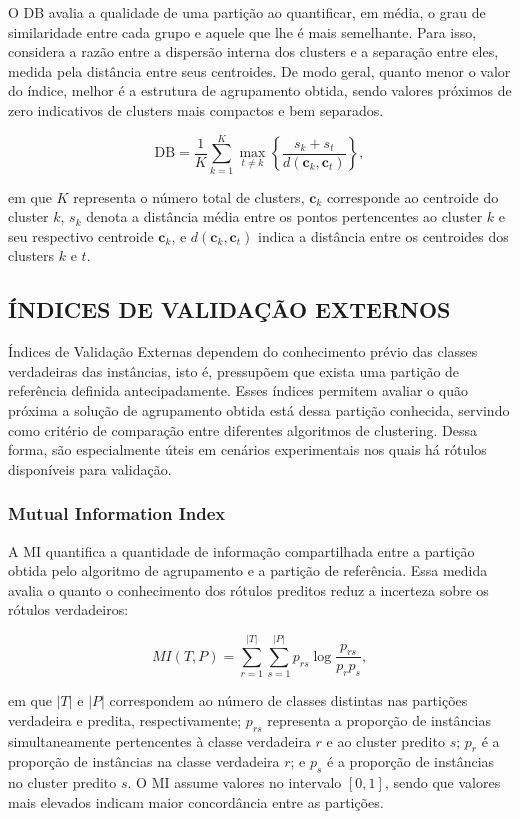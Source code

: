O \gls{DB} \cite{davies1979cluster} avalia a qualidade de uma partição ao quantificar, em média, o grau de similaridade entre cada grupo e aquele que lhe é mais semelhante. Para isso, considera a razão entre a dispersão interna dos clusters e a separação entre eles, medida pela distância entre seus centroides. De modo geral, quanto menor o valor do índice, melhor é a estrutura de agrupamento obtida, sendo valores próximos de zero indicativos de clusters mais compactos e bem separados.

\[
\text{DB} = \frac{1}{K} \sum_{k=1}^K \max_{t \neq k} \left\{\frac{s_k + s_t}{d(\mathbf{c}_k, \mathbf{c}_t)}\right\},
\]

em que $K$ representa o número total de clusters, $\mathbf{c}_k$ corresponde ao centroide do cluster $k$, $s_k$ denota a distância média entre os pontos pertencentes ao cluster $k$ e seu respectivo centroide $\mathbf{c}_k$, e $d(\mathbf{c}_k, \mathbf{c}_t)$ indica a distância entre os centroides dos clusters $k$ e $t$.

\subsection{ÍNDICES DE VALIDAÇÃO EXTERNOS}

Índices de Validação Externas dependem do conhecimento prévio das classes verdadeiras das instâncias, isto é, pressupõem que exista uma partição de referência definida antecipadamente. Esses índices permitem avaliar o quão próxima a solução de agrupamento obtida está dessa partição conhecida, servindo como critério de comparação entre diferentes algoritmos de clustering. Dessa forma, são especialmente úteis em cenários experimentais nos quais há rótulos disponíveis para validação.

\subsubsection{Mutual Information Index}

A \gls{MI} \cite{strehl2002cluster} quantifica a quantidade de informação compartilhada entre a partição obtida pelo algoritmo de agrupamento e a partição de referência. Essa medida avalia o quanto o conhecimento dos rótulos preditos reduz a incerteza sobre os rótulos verdadeiros:

\[
MI(T, P) = \sum_{r=1}^{|T|} \sum_{s=1}^{|P|} p_{rs} \log\frac{p_{rs}}{p_r p_s},
\]

em que $|T|$ e $|P|$ correspondem ao número de classes distintas nas partições verdadeira e predita, respectivamente; $p_{rs}$ representa a proporção de instâncias simultaneamente pertencentes à classe verdadeira $r$ e ao cluster predito $s$; $p_r$ é a proporção de instâncias na classe verdadeira $r$; e $p_s$ é a proporção de instâncias no cluster predito $s$. O \gls{MI} assume valores no intervalo $[0,1]$, sendo que valores mais elevados indicam maior concordância entre as partições.

